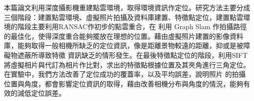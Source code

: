 
本篇論文利用深度攝影機重建點雲環境，取得環境資訊作定位。研究方法主要分成三個階段：建置點雲環境、虛擬照片拍攝及資料庫建置、特徵點定位，建置點雲環境的階段主要利用RANSAC作初步的點雲重合，在
利用 Graph Slam 作拍攝路徑的最佳化，使得深度重合能夠擺放在理想的位置。藉由虛擬照片建置的影像資料庫，能夠取得一般相機所缺乏的定位資訊，像是距離景物較遠的距離，抑或是被障礙物遮蔽所導致特徵
資訊缺乏的情形發生。在最後特徵點定位的階段，利用SIFT將虛擬相片與代訂為相片作比對，求出的特徵點根據位置及其夾角進行三角定位。在實驗中，我們方法改善了定位成功的覆蓋率，以及平均誤差，說明照片
的拍攝位置與角度，都會影響定位資訊的取得，藉由改善相機分布與角度的情況，能夠有效的減低定位誤差。
